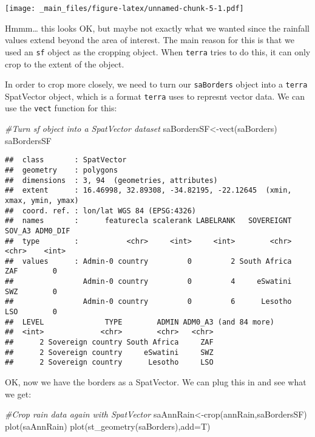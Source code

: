 \documentclass[
]{book}
\newenvironment{Shaded}{\begin{snugshade}}{\end{snugshade}}
\newcommand{\AttributeTok}[1]{\textcolor[rgb]{0.77,0.63,0.00}{#1}}
\newcommand{\CommentTok}[1]{\textcolor[rgb]{0.56,0.35,0.01}{\textit{#1}}}
\newcommand{\FunctionTok}[1]{\textcolor[rgb]{0.00,0.00,0.00}{#1}}
\newcommand{\NormalTok}[1]{#1}
\newcommand{\OtherTok}[1]{\textcolor[rgb]{0.56,0.35,0.01}{#1}}
\begin{document}
\texttt{[image: \_main\_files/figure-latex/unnamed-chunk-5-1.pdf]}

Hmmm\ldots{} this looks OK, but maybe not exactly what we wanted since the rainfall values extend beyond the area of interest. The main reason for this is that we used an \texttt{sf} object as the cropping object. When \texttt{terra} tries to do this, it can only crop to the extent of the object.

In order to crop more closely, we need to turn our \texttt{saBorders} object into a \texttt{terra} SpatVector object, which is a format \texttt{terra} uses to represnt vector data. We can use the \texttt{vect} function for this:

\begin{Shaded}
\begin{Highlighting}[]
\CommentTok{\#Turn sf object into a SpatVector dataset}
\NormalTok{saBordersSF}\OtherTok{\textless{}{-}}\FunctionTok{vect}\NormalTok{(saBorders)}
\NormalTok{saBordersSF}
\end{Highlighting}
\end{Shaded}

\begin{verbatim}
##  class       : SpatVector 
##  geometry    : polygons 
##  dimensions  : 3, 94  (geometries, attributes)
##  extent      : 16.46998, 32.89308, -34.82195, -22.12645  (xmin, xmax, ymin, ymax)
##  coord. ref. : lon/lat WGS 84 (EPSG:4326) 
##  names       :      featurecla scalerank LABELRANK   SOVEREIGNT SOV_A3 ADM0_DIF
##  type        :           <chr>     <int>     <int>        <chr>  <chr>    <int>
##  values      : Admin-0 country         0         2 South Africa    ZAF        0
##                Admin-0 country         0         4     eSwatini    SWZ        0
##                Admin-0 country         0         6      Lesotho    LSO        0
##  LEVEL              TYPE        ADMIN ADM0_A3 (and 84 more)
##  <int>             <chr>        <chr>   <chr>              
##      2 Sovereign country South Africa     ZAF              
##      2 Sovereign country     eSwatini     SWZ              
##      2 Sovereign country      Lesotho     LSO
\end{verbatim}

OK, now we have the borders as a SpatVector. We can plug this in and see what we get:

\begin{Shaded}
\begin{Highlighting}[]
\CommentTok{\#Crop rain data again with SpatVector}
\NormalTok{saAnnRain}\OtherTok{\textless{}{-}}\FunctionTok{crop}\NormalTok{(annRain,saBordersSF)}
\FunctionTok{plot}\NormalTok{(saAnnRain)}
\FunctionTok{plot}\NormalTok{(}\FunctionTok{st\_geometry}\NormalTok{(saBorders),}\AttributeTok{add=}\NormalTok{T)}
\end{Highlighting}
\end{Shaded}
\end{document}
